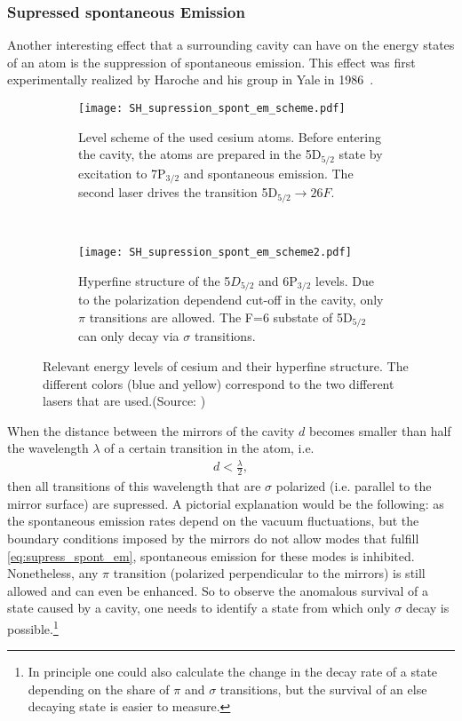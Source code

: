 \subsubsection{Supressed spontaneous Emission}
Another interesting effect that a surrounding cavity can have on the energy
states of an atom is the suppression of spontaneous emission. This effect was
first experimentally realized by Haroche and his group in Yale in
1986~\cite{haroche1987SupressedEmission}. 
\begin{figure}[h]
  \centering
  \begin{subfigure}[t]{.48\linewidth}
    \centering
    \texttt{[image: SH\_supression\_spont\_em\_scheme.pdf]}
    \caption{Level scheme of the used cesium atoms. Before entering the cavity,
    the atoms are prepared in the 5D$_{5/2}$ state by excitation to 7P$_{3/2}$
    and spontaneous emission. The second laser drives the transition
  5D$_{5/2} \rightarrow 26F$.}
    \label{fig:supression_scheme1}
  \end{subfigure}
  ~
  \begin{subfigure}[t]{.48\linewidth}
    \centering
    \texttt{[image: SH\_supression\_spont\_em\_scheme2.pdf]}
    \caption{Hyperfine structure of the 5$D_{5/2}$ and 6P$_{3/2}$ levels. Due to
    the polarization dependend cut-off in the cavity, only $\pi$ transitions are
    allowed. The F=6 substate of 5D$_{5/2}$ can only decay via
  $\sigma$ transitions.}
  \label{fig:supression_scheme2}
  \end{subfigure}
  \caption{Relevant energy levels of cesium and their hyperfine structure. The
  different colors (blue and yellow) correspond to the two different lasers that
are used.(Source: \cite{haroche1987SupressedEmission})}
\end{figure}
When the distance between the mirrors
of the cavity $d$ becomes smaller than half the wavelength $\lambda$ of a
certain transition in the atom, i.e.
\begin{align}
  \label{eq:supress_spont_em}
  d < \frac{\lambda}{2},
\end{align}
then all transitions of this wavelength that are $\sigma$ polarized (i.e.
parallel to the mirror surface) are supressed. A pictorial explanation would be
the following: as the spontaneous emission rates depend on the vacuum
fluctuations, but the boundary conditions imposed by the mirrors do not allow
modes that fulfill \eqref{eq:supress_spont_em}, spontaneous emission for
these modes is inhibited. Nonetheless, any $\pi$ transition (polarized
perpendicular to the mirrors) is still allowed and can even be enhanced. So to
observe the anomalous survival of a state caused by a cavity, one needs to
identify a state from which only $\sigma$ decay is possible.\footnote{In
principle one could also calculate the change in the decay rate of a state
depending on the share of $\pi$ and $\sigma$ transitions, but the survival of an
else decaying state is easier to measure.}

